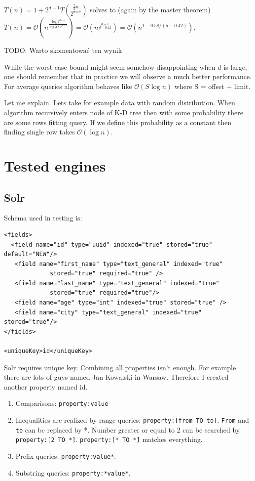 \documentclass[10pt,a4paper]{article}
\newcommand{\todo}[1]{\noindent\colorbox{myRed}{TODO: #1}}
\newcommand{\Oh}{\mathcal{O}}
\begin{document}
$T(n)=1+2^{d-1}T(\frac{\frac{2}{3}n}{2^{d-1}})$ solves to (again by the master theorem) $T(n)=\Oh(n^{\frac{\log 2^{d-1}}{\log 3*2^{d-2}}})=\Oh(n^{\frac{d-1}{d-0.42}})=\Oh(n^{1-0.58/(d-0.42)})$. 

\todo{Warto skomentować ten wynik}

While the worst case bound might seem somehow disappointing when $d$ is large, one should remember that in practice we will observe a much better performance. For average queries algorithm behaves like $\Oh(S \log n)$ where S = offset + limit.

Let me explain. Lets take for example data with random distribution. When algorithm recursively enters node of K-D tree then with some probability there are some rows fitting query. If we define this probability as a constant then finding single row takes $\Oh(\log n)$.

\section{Tested engines}
\subsection{Solr}

Schema used in testing is:

\begin{verbatim}
<fields>
  <field name="id" type="uuid" indexed="true" stored="true" default="NEW"/>
   <field name="first_name" type="text_general" indexed="true"
             stored="true" required="true" /> 
   <field name="last_name" type="text_general" indexed="true" 
             stored="true" required="true"/>
   <field name="age" type="int" indexed="true" stored="true" /> 
   <field name="city" type="text_general" indexed="true" stored="true"/>
</fields>

<uniqueKey>id</uniqueKey> 
\end{verbatim}

Solr requires unique key. Combining all properties isn't enough. For example there are lots of guys named Jan Kowalski in Warsaw. Therefore I created another property named id.

\begin{enumerate}
\item Comparisons: \verb|property:value|
\item Inequalities are realized by range queries: \verb|property:[from TO to]|. \verb|From| and \verb|to| can be replaced by *. Number greater or equal to 2 can be searched by \verb|property:[2 TO *]|. \verb|property:[* TO *]| matches everything.
\item Prefix queries: \verb|property:value*|.
\item Substring queries: \verb|property:*value*|.
 
\end{enumerate}
\end{document}
